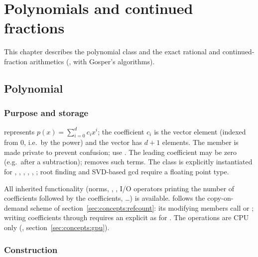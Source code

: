 \chapter{Polynomials and continued fractions}\label{ch:polynomial}

This chapter describes the polynomial class  and the exact rational and continued-fraction arithmetics
(,  with Gosper's algorithms).

\section{Polynomial}\label{sec:polynomial:polynomial}

\subsection{Purpose and storage}
 represents $p(x)=\sum_{i=0}^{d}c_ix^i$; the coefficient $c_i$ is the vector element
 (indexed from 0, i.e.\ by the power) and the vector has $d+1$ elements. The member  is made private to prevent confusion; use
. The leading coefficient may be zero (e.g.\ after a subtraction);  removes such terms. The class is explicitly
instantiated for , , , , , ; root finding and SVD-based gcd require a floating point type.

All inherited  functionality (norms, , , I/O operators printing the number of coefficients followed by the
coefficients, \ldots) is available.  follows the copy-on-demand scheme of section~\ref{sec:concepts:refcount}: its modifying members call
 or ; writing coefficients through  requires an explicit  as for .
The operations are CPU only (, section~\ref{sec:concepts:gpu}).

\subsection{Construction}
\begin{lareference}
\end{lareference}

